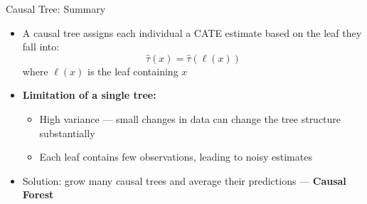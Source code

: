 \documentclass[hyperref={pdfpagelabels=false}]{beamer}
\begin{document}
\begin{frame}{Causal Tree: Summary}
	\begin{itemize}
		\item A causal tree assigns each individual a CATE estimate based on the leaf they fall into:
		\begin{equation*}
			\hat{\tau}(x) = \hat{\tau}(\ell(x))
		\end{equation*}
		where $\ell(x)$ is the leaf containing $x$
		\vspace{0.3cm}
		\item \textbf{Limitation of a single tree:}
		\vspace{0.2cm}
		\begin{itemize}
			\item High variance --- small changes in data can change the tree structure substantially
			\vspace{0.2cm}
			\item Each leaf contains few observations, leading to noisy estimates
		\end{itemize}
		\vspace{0.3cm}
		\item Solution: grow many causal trees and average their predictions --- \textbf{Causal Forest}
	\end{itemize}
\end{frame}
\end{document}
